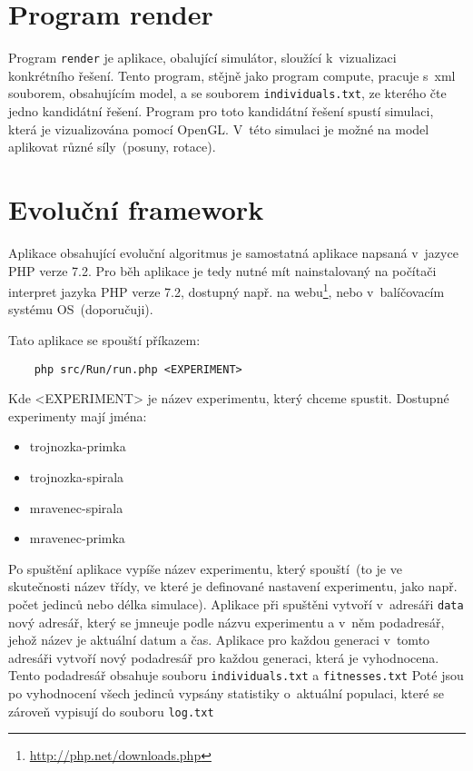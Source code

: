 \section{Program render}
Program \texttt{render} je aplikace, obalující simulátor, sloužící k~vizualizaci konkrétního řešení.
Tento program, stějně jako program compute, pracuje s~xml souborem, obsahujícím model, a se souborem \texttt{individuals.txt}, ze kterého čte jedno kandidátní řešení.
Program pro toto kandidátní řešení spustí simulaci, která je vizualizována pomocí OpenGL\@.
V~této simulaci je možné na model aplikovat různé síly~(posuny, rotace).


\section{Evoluční framework}
Aplikace obsahující evoluční algoritmus je samostatná aplikace napsaná v~jazyce PHP verze 7.2.
Pro běh aplikace je tedy nutné mít nainstalovaný na počítači interpret jazyka PHP verze 7.2, dostupný např. na webu\footnote{\url{http://php.net/downloads.php}}, nebo v~balíčovacím systému OS~(doporučuji).

Tato aplikace se spouští příkazem:
\begin{verbatim}
    php src/Run/run.php <EXPERIMENT>
\end{verbatim}

Kde <EXPERIMENT> je název experimentu, který chceme spustit.
Dostupné experimenty mají jména:
\begin{itemize}
    \item trojnozka-primka
    \item trojnozka-spirala
    \item mravenec-spirala
    \item mravenec-primka
\end{itemize}

Po spuštění aplikace vypíše název experimentu, který spouští~(to je ve skutečnosti název třídy, ve které je definované nastavení experimentu, jako např. počet jedinců nebo délka simulace).
Aplikace při spuštěni vytvoří v~adresáři \texttt{data} nový adresář, který se jmneuje podle názvu experimentu a v~něm podadresář, jehož název je aktuální datum a čas.
Aplikace pro každou generaci v~tomto adresáři vytvoří nový podadresář pro každou generaci, která je vyhodnocena.
Tento podadresář obsahuje souboru \texttt{individuals.txt} a \texttt{fitnesses.txt}
Poté jsou po vyhodnocení všech jedinců vypsány statistiky o~aktuální populaci, které se zároveň vypisují do souboru \texttt{log.txt}





